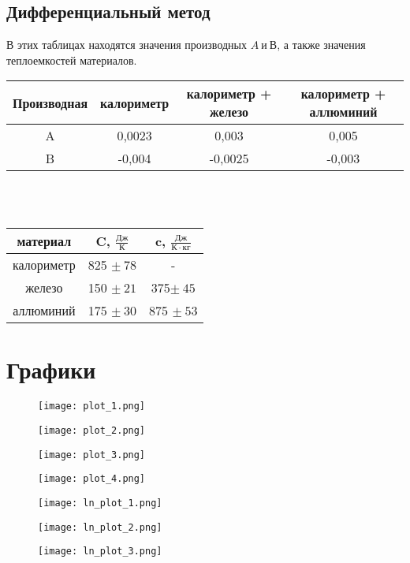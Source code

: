 \documentclass[a4paper, 12pt]{article}
\begin{document}
\subsection{Дифференциальный метод}
В этих таблицах находятся значения производных \(A \ и \ В\), а также значения теплоемкостей материалов.
\begin{table}[h]
    \begin{center}
        
    \begin{tabular}{|c|c|c|c|}
    \hline
        Производная & калориметр & калориметр + железо & калориметр + аллюминий \\
    \hline
         A &  0,0023  & 0,003   & 0,005\\
    \hline
         B &  -0,004 & -0,0025 & -0,003\\
    \hline
    \end{tabular}
    \end{center}
    \\
    \\
    \begin{center}
        \begin{tabular}{|c|c|c|}
        \hline
             материал   & C, \(\frac{Дж}{К}\) & c, \(\frac{Дж}{К \cdot кг}\)\\
        \hline
             калориметр &  825 \(\pm \ 78\)  & -\\
             железо     &  150 \(\pm \ 21\)  & 375\(\pm \ 45\)\\
             аллюминий  &  175 \(\pm \ 30\)  & 875 \(\pm \ 53\)\\
        \hline    
    \end{tabular}  
    \end{center}
\end{table}
\newpage
\section{Графики}
\begin{figure}[h]
    \centering
    \texttt{[image: plot\_1.png]}
\end{figure}
\begin{figure}[h]
    \centering
    \texttt{[image: plot\_2.png]}
\end{figure}
\begin{figure}[h]
    \centering
    \texttt{[image: plot\_3.png]}
\end{figure}
\begin{figure}[h]
    \centering
    \texttt{[image: plot\_4.png]}
\end{figure}
\begin{figure}[h]
    \centering
    \texttt{[image: ln\_plot\_1.png]}
\end{figure}
\begin{figure}[h]
    \centering
    \texttt{[image: ln\_plot\_2.png]}
\end{figure}
\begin{figure}[h]
    \centering
    \texttt{[image: ln\_plot\_3.png]}
\end{figure}
\end{document}
